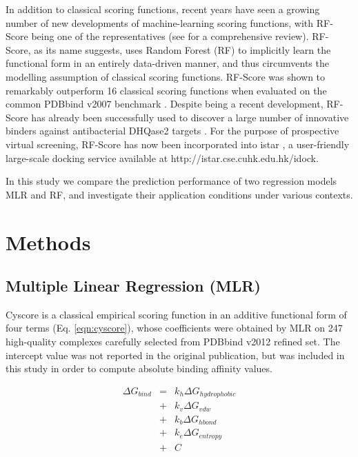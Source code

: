 \documentclass[10pt,conference,compsocconf]{IEEEtran}
\begin{document}
In addition to classical scoring functions, recent years have seen a growing number of new developments of machine-learning scoring functions, with RF-Score \cite{564} being one of the representatives (see \cite{1373} for a comprehensive review). RF-Score, as its name suggests, uses Random Forest (RF) \cite{1309} to implicitly learn the functional form in an entirely data-driven manner, and thus circumvents the modelling assumption of classical scoring functions. RF-Score was shown to remarkably outperform 16 classical scoring functions when evaluated on the common PDBbind v2007 benchmark \cite{564}. Despite being a recent development, RF-Score has already been successfully used to discover a large number of innovative binders against antibacterial DHQase2 targets \cite{1281}. For the purpose of prospective virtual screening, RF-Score has now been incorporated into istar \cite{1362}, a user-friendly large-scale docking service available at http://istar.cse.cuhk.edu.hk/idock.

In this study we compare the prediction performance of two regression models MLR and RF, and investigate their application conditions under various contexts.

\section{Methods}


\subsection{Multiple Linear Regression (MLR)}

Cyscore is a classical empirical scoring function in an additive functional form of four terms (Eq. \ref{eqn:cyscore}), whose coefficients were obtained by MLR on 247 high-quality complexes carefully selected from PDBbind v2012 refined set. The intercept value was not reported in the original publication, but was included in this study in order to compute absolute binding affinity values.

\begin{eqnarray}
\label{eqn:cyscore}
\Delta G_{bind}
&=& k_h\Delta G_{hydrophobic} \nonumber \\
&+& k_v\Delta G_{vdw} \nonumber \\
&+& k_b\Delta G_{hbond} \nonumber \\
&+& k_e\Delta G_{entropy} \nonumber \\
&+& C
\end{eqnarray}
\end{document}
